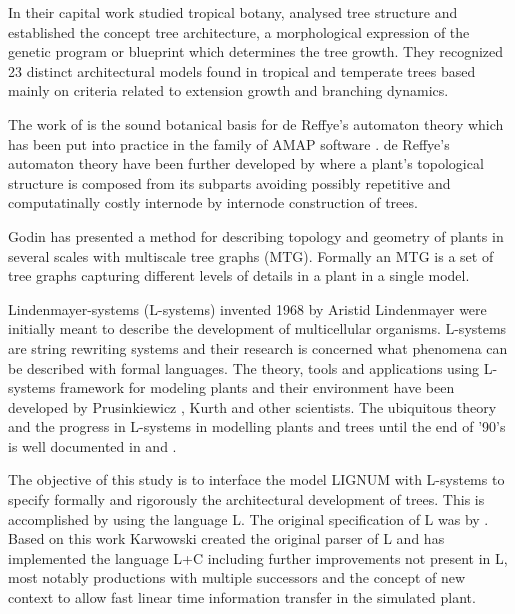 In  their  capital  work  \citet{halle:78}  studied  tropical  botany,
analysed tree structure and established the concept tree architecture,
a morphological  expression of the genetic program  or blueprint which
determines the tree growth.  They recognized 23 distinct architectural
models found in tropical and  temperate trees based mainly on criteria
related to extension growth and branching dynamics.

The  work of  \citet{halle:78} is  the  sound botanical  basis for  de
Reffye's automaton theory \citep[see e.g.][]{dereffye:89, dereffye:95,
  dereffye:97, jaeger:92} which  has been put  into practice  in the
family  of AMAP software  \citep{fourcard:97}.  de  Reffye's automaton
theory have  been further developed by \citet{yan:01}  where a plant's
topological structure is composed  from its subparts avoiding possibly
repetitive   and   computatinally   costly  internode   by   internode
construction of trees.

Godin \citep{godin:99} has presented  a method for describing topology
and geometry of  plants in several scales with  multiscale tree graphs
(MTG).   Formally an  MTG is  a  set of  tree graphs  \citep{godin:98}
capturing different levels of details in a plant in a single model.

Lindenmayer-systems (L-systems)  invented 1968 by  Aristid Lindenmayer
\citep{lindenmayer:68,   lindenmayer:71}  were   initially   meant  to
describe  the development of  multicellular organisms.   L-systems are
string  rewriting  systems  and   their  research  is  concerned  what
phenomena can  be described with  formal languages. The  theory, tools
and  applications using  L-systems framework  for modeling  plants and
their    environment   have    been    developed   by    Prusinkiewicz
\citep{pp:89,pp:92}, Kurth \citep{kurth:94} and other scientists.  The
ubiquitous theory  and the progress  in L-systems in  modelling plants
and   trees  until   the  end   of   '90's  is   well  documented   in
\citet{pp:90,pp:99} and \citet{kurth:99}.

The  objective of this  study is  to interface  the model  LIGNUM with
L-systems  to  specify   formally  and  rigorously  the  architectural
development of trees.   This is accomplished by using  the language L.
The original specification of L  was by \citet{pp:99a}.  Based on this
work Karwowski  created the original  parser of L and  has implemented
the language  L+C \citep{karwowski:02} including  further improvements
not present  in L, most  notably productions with  multiple successors
and  the concept  of new  context \citep{karwowski:03}  to  allow fast
linear time information transfer in the simulated plant.

